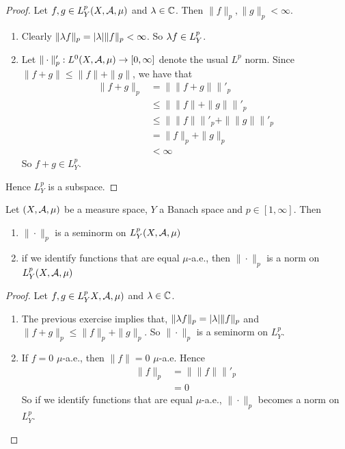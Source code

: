 \documentclass{book}
\begin{document}
	\begin{proof}Let $f, g \in L^p_Y(X, \mathcal{A}, \mu)$ and $\lambda \in \mathbb{C}$. Then $\|f\|_p, \|g\|_p < \infty$.
	\begin{enumerate}
	\item Clearly $\|\lambda f\|_p = |\lambda|\|f\|_p < \infty$.
	So $\lambda f \in L^p_Y$.
	\item Let $\|\cdot \|'_p: L^0(X, \mathcal{A}, \mu) \rightarrow [0,\infty]$ denote the usual $L^p$ norm. Since $\|f + g\| \leq \|f\| + \|g\|$, we have that 
	\begin{align*}
	\|f+g\|_p 
	&= \| \|f+g\| \|'_p \\
	& \leq \|\|f\| + \|g\| \|'_p \\
	& \leq  \|\|f\| \|'_p + \|\|g\| \|'_p \\
	&= \|f \|_p + \|g\|_p \\
	& < \infty
\end{align*}	
So $f+g \in L^p_Y$.
	\end{enumerate}
	Hence $L^p_Y$ is a subspace.
	\end{proof}
	
	\begin{ex}  
	Let $(X, \mathcal{A}, \mu)$ be a measure space, $Y$ a Banach space and $p \in [1, \infty]$. Then 
	\begin{enumerate}
	\item $\|\cdot\|_p$ is a seminorm on $L^p_Y(X, \mathcal{A}, \mu)$
	\item if we identify functions that are equal $\mu$-a.e., then $\|\cdot\|_p$ is a norm on $L^p_Y(X, \mathcal{A}, \mu)$
	\end{enumerate}
	\end{ex}
	
	\begin{proof} 
	Let $f, g \in L^p_YX, \mathcal{A}, \mu)$ and $\lambda \in \mathbb{C}$. 
	\begin{enumerate}
	\item The previous exercise implies that, $\|\lambda f\|_p = |\lambda|\|f\|_p$ and $\|f+g\|_p \leq \|f\|_p + \|g \|_p$. So $\|\cdot\|_p$ is a seminorm on $L_Y^p$.
	\item If $f = 0$ $\mu$-a.e., then $\|f\| = 0$  $\mu$-a.e. Hence
	\begin{align*}
	\|f\|_p 
	&= \|\|f\|\|'_p \\
	&= 0
\end{align*}
	So if we identify functions that are equal $\mu$-a.e., $\|\cdot\|_p$ becomes a norm on $L^p_Y$. 	  
	\end{enumerate}
	\end{proof}
	
\end{document}
